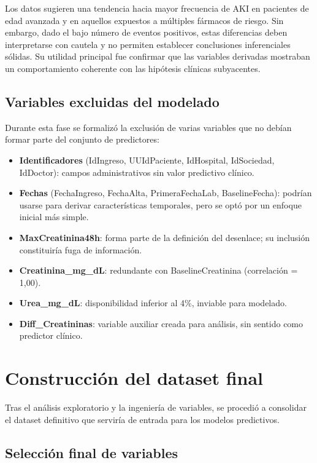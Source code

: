 \documentclass[12pt, a4paper, oneside]{report}
\begin{document}
Los datos sugieren una tendencia hacia mayor frecuencia de AKI en pacientes de edad avanzada y en aquellos expuestos a múltiples fármacos de riesgo. Sin embargo, dado el bajo número de eventos positivos, estas diferencias deben interpretarse con cautela y no permiten establecer conclusiones inferenciales sólidas. Su utilidad principal fue confirmar que las variables derivadas mostraban un comportamiento coherente con las hipótesis clínicas subyacentes.

\subsection{Variables excluidas del modelado}

Durante esta fase se formalizó la exclusión de varias variables que no debían formar parte del conjunto de predictores:

\begin{itemize}
    \item \textbf{Identificadores} (IdIngreso, UUIdPaciente, IdHospital, IdSociedad, IdDoctor): campos administrativos sin valor predictivo clínico.
    \item \textbf{Fechas} (FechaIngreso, FechaAlta, PrimeraFechaLab, BaselineFecha): podrían usarse para derivar características temporales, pero se optó por un enfoque inicial más simple.
    \item \textbf{MaxCreatinina48h}: forma parte de la definición del desenlace; su inclusión constituiría fuga de información.
    \item \textbf{Creatinina\_mg\_dL}: redundante con BaselineCreatinina (correlación = 1,00).
    \item \textbf{Urea\_mg\_dL}: disponibilidad inferior al 4\%, inviable para modelado.
    \item \textbf{Diff\_Creatininas}: variable auxiliar creada para análisis, sin sentido como predictor clínico.
\end{itemize}

\section{Construcción del dataset final}

Tras el análisis exploratorio y la ingeniería de variables, se procedió a consolidar el dataset definitivo que serviría de entrada para los modelos predictivos.

\subsection{Selección final de variables}
\end{document}
